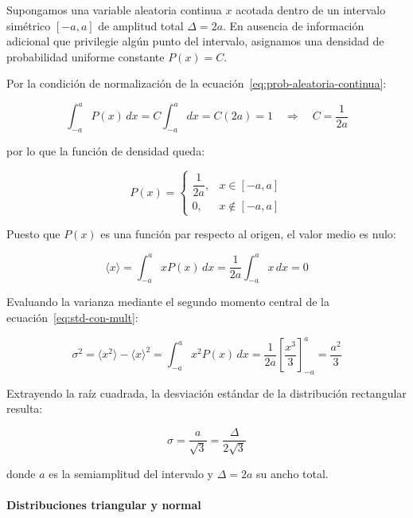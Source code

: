 Supongamos una variable aleatoria continua $x$ acotada dentro de un intervalo simétrico $[-a, a]$ de amplitud total $\Delta = 2a$. En ausencia de información adicional que privilegie algún punto del intervalo, asignamos una densidad de probabilidad uniforme constante $P(x) = C$.

Por la condición de normalización de la ecuación~\eqref{eq:prob-aleatoria-continua}:

\begin{equation}
    \int_{-a}^{a} P(x) \, dx = C \int_{-a}^{a} dx = C(2a) = 1
    \quad\Longrightarrow\quad
    C = \frac{1}{2a}
\end{equation}

por lo que la función de densidad queda:

\begin{equation}
    P(x) =
    \begin{cases}
        \dfrac{1}{2a}, & x \in [-a, a] \\[6pt]
        0, & x \notin [-a, a]
    \end{cases}
    \label{eq:distribucion-rectangular}
\end{equation}

Puesto que $P(x)$ es una función par respecto al origen, el valor medio es nulo:

\begin{equation}
    \langle x \rangle = \int_{-a}^{a} x P(x) \, dx = \frac{1}{2a} \int_{-a}^{a} x \, dx = 0
\end{equation}

Evaluando la varianza mediante el segundo momento central de la ecuación~\eqref{eq:std-con-mult}:

\begin{equation}
    \sigma^2 = \langle x^2 \rangle - \langle x \rangle^2
    = \int_{-a}^{a} x^2 P(x) \, dx
    = \frac{1}{2a} \left[ \frac{x^3}{3} \right]_{-a}^{a}
    = \frac{a^2}{3}
\end{equation}

Extrayendo la raíz cuadrada, la desviación estándar de la distribución rectangular resulta:

\begin{equation}
    \sigma = \frac{a}{\sqrt{3}} = \frac{\Delta}{2\sqrt{3}}
    \label{eq:sigma-rectangular}
\end{equation}

donde $a$ es la semiamplitud del intervalo y $\Delta = 2a$ su ancho total.

\paragraph{Distribuciones triangular y normal}

